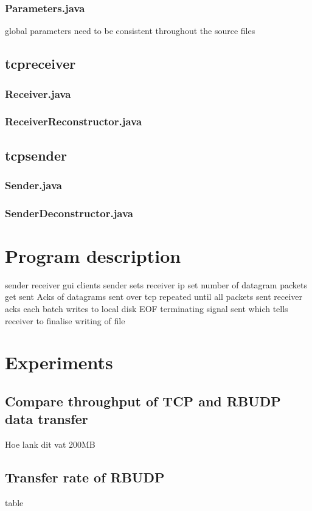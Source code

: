 \documentclass[a4paper,10pt]{article}
\begin{document}
\subsubsection{Parameters.java}
global parameters need to be consistent throughout the source files

\subsection{tcpreceiver}
\subsubsection{Receiver.java}
\subsubsection{ReceiverReconstructor.java}

\subsection{tcpsender}
\subsubsection{Sender.java}
\subsubsection{SenderDeconstructor.java}

\section{Program description}
sender receiver gui clients
sender sets receiver ip
set number of datagram packets get sent
Acks of datagrams sent over tcp
repeated until all packets sent
receiver acks each batch 
writes to local disk
EOF terminating signal sent which tells receiver to finalise writing of file

\section{Experiments}
\subsection{Compare throughput of TCP and RBUDP data transfer}
Hoe lank dit vat 200MB

\subsection{Transfer rate of RBUDP}
table
\end{document}

